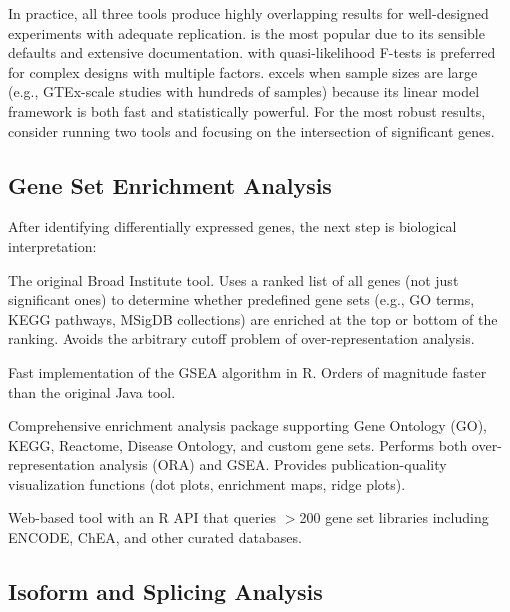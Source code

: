 \begin{tipbox}
In practice, all three tools produce highly overlapping results for well-designed
experiments with adequate replication.  is the most popular due
to its sensible defaults and extensive documentation.  with
quasi-likelihood F-tests is preferred for complex designs with multiple factors.
 excels when sample sizes are large (e.g., GTEx-scale
studies with hundreds of samples) because its linear model framework is both
fast and statistically powerful. For the most robust results, consider running
two tools and focusing on the intersection of significant genes.
\end{tipbox}

\subsection{Gene Set Enrichment Analysis}

After identifying differentially expressed genes, the next step is biological
interpretation:

\begin{description}[style=nextline]
  \item[\software{GSEA} (Gene Set Enrichment Analysis)] The original
    Broad Institute tool. Uses a ranked list of all genes (not just significant
    ones) to determine whether predefined gene sets (e.g., GO terms, KEGG
    pathways, MSigDB collections) are enriched at the top or bottom of the
    ranking. Avoids the arbitrary cutoff problem of over-representation analysis.
  \item[\software{fgsea} (R/Bioconductor)] Fast implementation of the GSEA
    algorithm in R. Orders of magnitude faster than the original Java tool.
  \item[\software{clusterProfiler} (R/Bioconductor)] Comprehensive enrichment
    analysis package supporting Gene Ontology (GO), KEGG, Reactome, Disease
    Ontology, and custom gene sets. Performs both over-representation analysis
    (ORA) and GSEA. Provides publication-quality visualization functions
    (dot plots, enrichment maps, ridge plots).
  \item[\software{enrichR}] Web-based tool with an R API that queries $>$200
    gene set libraries including ENCODE, ChEA, and other curated databases.
\end{description}

\subsection{Isoform and Splicing Analysis}

